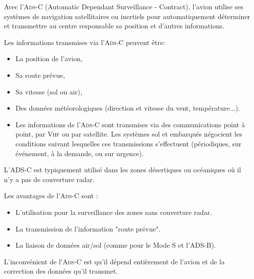 Avec l'\textsc{Ads-C} (Automatic Dependant Surveillance - Contract), l'avion utilise ses systèmes de navigation satellitaires ou inertiels pour automatiquement déterminer et transmettre au centre responsable sa position et d'autres informations.

Les informations transmises via l'\textsc{Ads-C} peuvent être:
\begin{itemize}
\item La position de l'avion,
\item Sa route prévue,
\item Sa vitesse (sol ou air),
\item Des données météorologiques (direction et vitesse du vent, température...).
\item Les informations de l'\textsc{Ads-C} sont transmises via des communications point à point, par \textsc{Vhf} ou par satellite. Les systèmes sol et embarqués négocient les conditions suivant lesquelles ces transmissions s'effectuent (périodiques, sur événement, à la demande, ou sur urgence).
\end{itemize}\medskip

L'ADS-C est typiquement utilisé dans les zones désertiques ou océaniques où il n'y a pas de couverture radar.

Les avantages de l'\textsc{Ads-C} sont :
\begin{itemize}
\item L'utilisation pour la surveillance des zones sans couverture radar.
\item La transmission de l'information "route prévue".
\item La liaison de données air/sol (comme pour le Mode S et l'ADS-B).
\end{itemize}\medskip

L'inconvénient de l'\textsc{Ads-C} est qu'il dépend entièrement de l'avion et de la correction des données qu'il transmet.




